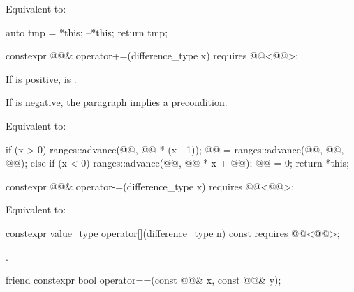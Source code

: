 \begin{itemdescr}
\pnum
\effects
Equivalent to:
\begin{codeblock}
auto tmp = *this;
--*this;
return tmp;
\end{codeblock}
\end{itemdescr}

\begin{itemdecl}
constexpr @@& operator+=(difference_type x)
  requires @@<@@>;
\end{itemdecl}

\begin{itemdescr}
\pnum
\expects
If  is positive,
is .
\begin{note}
If  is negative, the  paragraph implies a precondition.
\end{note}

\pnum
\effects
Equivalent to:
\begin{codeblock}
if (x > 0) {
  ranges::advance(@@, @@ * (x - 1));
  @@ = ranges::advance(@@, @@, @@);
} else if (x < 0) {
  ranges::advance(@@, @@ * x + @@);
  @@ = 0;
}
return *this;
\end{codeblock}
\end{itemdescr}

\begin{itemdecl}
constexpr @@& operator-=(difference_type x)
  requires @@<@@>;
\end{itemdecl}

\begin{itemdescr}
\pnum
\effects
Equivalent to: 
\end{itemdescr}

\begin{itemdecl}
constexpr value_type operator[](difference_type n) const
  requires @@<@@>;
\end{itemdecl}

\begin{itemdescr}
\pnum
\returns
{}.
\end{itemdescr}

\begin{itemdecl}
friend constexpr bool operator==(const @@& x, const @@& y);
\end{itemdecl}

